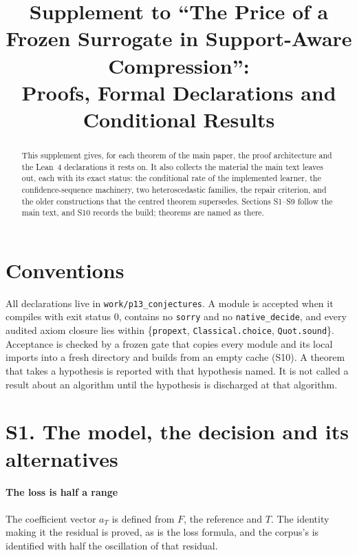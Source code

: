 



\title{Supplement to ``The Price of a Frozen Surrogate in Support-Aware Compression'':\\
Proofs, Formal Declarations and Conditional Results}

\author{
}

\maketitle

\begin{abstract}
This supplement gives, for each theorem of the main paper, the proof architecture and the
Lean~4 declarations it rests on. It also collects the material the main text leaves out, each
with its exact status: the conditional rate of the implemented learner, the confidence-sequence
machinery, two heteroscedastic families, the repair criterion, and the older constructions that
the centred theorem supersedes. Sections S1--S9 follow the main text, and S10 records the build; theorems are named as
there.
\end{abstract}

\section*{Conventions}

All declarations live in \texttt{work/p13\_conjectures}. A module is accepted when it compiles
with exit status $0$, contains no \texttt{sorry} and no \texttt{native\_decide}, and every audited
axiom closure lies within \{\texttt{propext}, \texttt{Classical.choice}, \texttt{Quot.sound}\}.
Acceptance is checked by a frozen gate that copies every module and its local imports into a
fresh directory and builds from an empty cache (S10). A theorem that takes a hypothesis is
reported with that hypothesis named. It is not called a result about an algorithm until the
hypothesis is discharged at that algorithm.

\section{S1. The model, the decision and its alternatives}

\paragraph{The loss is half a range} The coefficient vector $a_{T}$ is defined from $F$, the
reference and $T$. The identity making it the residual is proved, as is the loss formula, and
the corpus's  is identified with half the oscillation of that residual.

